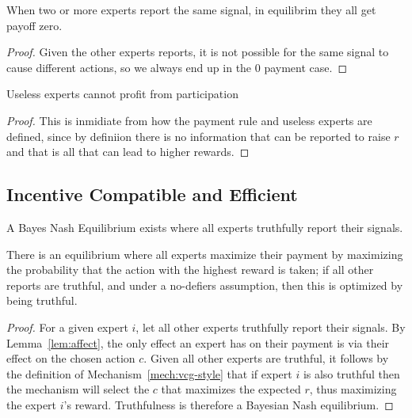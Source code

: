 \begin{lem}
	When two or more experts report the same signal, in equilibrim they all get payoff zero. 
\end{lem}

\begin{proof}
	Given the other experts reports, it is not possible for the same signal to cause different actions, so we always end up in the 0 payment case.
\end{proof}




\begin{lem}
	Useless experts cannot profit from participation
\end{lem}

\begin{proof}
This is inmidiate from how the payment rule and useless experts are defined, since by definiion there is no information that can be reported to raise $r$ and that is all that can lead to higher rewards.
\end{proof}


\subsection{Incentive Compatible and Efficient}

\begin{thm}
	A Bayes Nash Equilibrium exists where all experts truthfully report their signals.
\end{thm}

There is an equilibrium where all experts maximize their payment by maximizing the probability that the action with the highest reward is taken; if all other reports are truthful, and under a no-defiers assumption, then this is optimized by being truthful.


\begin{proof}
For a given expert $i$, let all other experts truthfully report their signals. By Lemma~\ref{lem:affect}, the only effect an expert has on their payment is via their effect on the chosen action $c$. Given all other experts are truthful, it follows by the definition of Mechanism~\ref{mech:vcg-style} that if expert $i$ is also truthful then the mechanism will select the $c$ that maximizes the expected $r$, thus maximizing the expert $i$'s reward. Truthfulness is therefore a Bayesian Nash equilibrium.
\end{proof}


